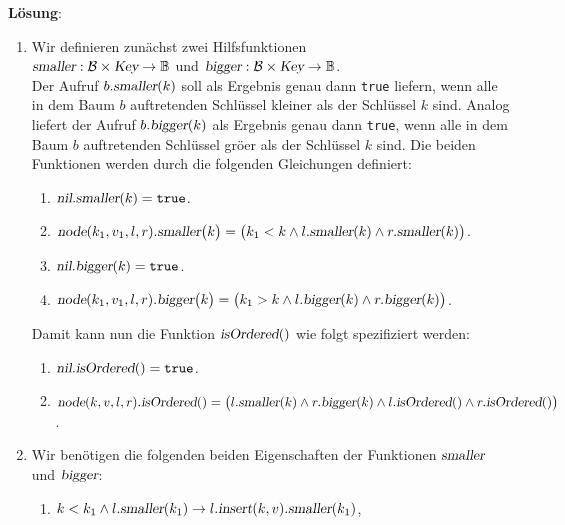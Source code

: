 \documentclass{article}
\newcommand{\solution}{\vspace*{0.2cm}

\noindent
\textbf{L\"osung}: }
\begin{document}
\solution
\begin{enumerate}
\item Wir definieren zun\"achst zwei Hilfsfunktionen
      \\[0.2cm]
      \hspace*{1.3cm} 
      $\textsl{smaller}: \mathcal{B} \times \textsl{Key} \rightarrow \mathbb{B}$ 
      \quad und \quad
      $\textsl{bigger}: \mathcal{B} \times \textsl{Key} \rightarrow \mathbb{B}$.
      \\[0.2cm]
      Der Aufruf $b.\textsl{smaller}(k)$ soll als Ergebnis genau dann \texttt{true}
      liefern, wenn alle in dem Baum $b$ auftretenden Schl\"ussel kleiner als der Schl\"ussel
      $k$ sind.  Analog liefert der Aufruf $b.\textsl{bigger}(k)$  als Ergebnis genau dann \texttt{true},
      wenn alle in dem Baum $b$ auftretenden Schl\"ussel gr\"o\3er als der Schl\"ussel
      $k$ sind.  Die beiden Funktionen werden durch die folgenden Gleichungen definiert:
      \begin{enumerate}
      \item $\textsl{nil}.\textsl{smaller}(k) = \mathtt{true}$.
      \item $\textsl{node}(k_1,v_1,l,r).\textsl{smaller}\bigl(k\bigr) = 
                \bigl(k_1 < k \wedge l.\textsl{smaller}(k) \wedge r.\textsl{smaller}(k)\bigr)$.
      \item $\textsl{nil}.\textsl{bigger}(k) = \mathtt{true}$.
      \item $\textsl{node}(k_1,v_1,l,r).\textsl{bigger}\bigl(k\bigr) = 
             \bigl(k_1 > k \wedge l.\textsl{bigger}(k) \wedge r.\textsl{bigger}(k)\bigr)$.
      \end{enumerate}
      Damit kann nun die Funktion $\textsl{isOrdered}()$ wie folgt spezifiziert werden:
      \begin{enumerate}
      \item $\textsl{nil}.\textsl{isOrdered}() = \mathtt{true}$.
      \item $\textsl{node}(k,v,l,r).\textsl{isOrdered}() = 
             \bigl(l.\textsl{smaller}(k) \wedge r.\textsl{bigger}(k) 
             \wedge l.\textsl{isOrdered}() \wedge r.\textsl{isOrdered}()\bigr)
            $.
      \end{enumerate}
\item Wir ben\"otigen die folgenden beiden Eigenschaften der Funktionen $\textsl{smaller}$ und
      $\textsl{bigger}$:
      \begin{enumerate}
      \item $k < k_1 \wedge l.\textsl{smaller}(k_1) \rightarrow l.\textsl{insert}(k,v).\textsl{smaller}(k_1)$,

\end{enumerate}
\end{enumerate}
\end{document}
